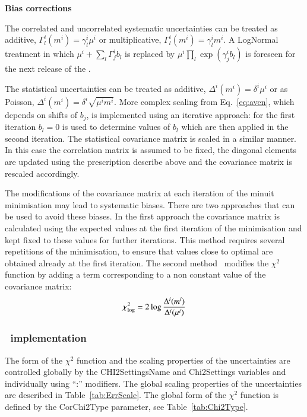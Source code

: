\begin{description}
\item \bf{Bias corrections}\rm

The correlated and uncorrelated systematic uncertainties can be treated as additive,  $\Gamma^i_l(m^i) = \gamma^i_l \mu^i$
or multiplicative, $\Gamma^i_l(m^i) = \gamma^i_l m^i$. A LogNormal treatment in which 
$ \mu^i + \sum_l \Gamma^i_j b_l$ is replaced by $ \mu^i \prod_l \exp( \gamma^i_j b_l) $ is foreseen for the
next release of the \fitter. 

The statistical uncertainties can be treated as additive, $\Delta^i(m^i) = \delta^i \mu^i$  or as Poisson,
$\Delta^i(m^i) = \delta^i \sqrt{\mu^i m^i}$. More complex scaling from Eq.~\ref{eq:aven}, 
which depends on shifts of $b_j$, is implemented using an iterative approach: for the first iteration $b_l =0$ 
 is used to determine values of $b_l$ which are then applied in the second iteration. The statistical covariance
matrix is scaled in a similar manner. In this case the correlation matrix is assumed to be fixed, the diagonal
elements are updated using the prescription describe above and the covariance matrix is rescaled accordingly.

The modifications of the covariance matrix at each iteration of the minuit minimisation may lead to systematic
biases. There are two approaches that can be used to avoid these biases. In the first approach the covariance matrix is calculated
using the expected values at the first iteration of the minimisation and kept fixed to these values for further
iterations. This method requires several repetitions of the minimisation, to ensure that values close to optimal
are obtained already at the first iteration. The second method~\cite{h1:2012kk} modifies the $\chi^2$ function by adding a term
corresponding to a non constant value of the covariance matrix:
\begin{equation}
 \chi^2_{\rm log} = 2 \log \frac{\Delta^i(m^i)}{\Delta^i(\mu^i)} 
\end{equation}  
\end{description}


\subsubsection{\fitter\ implementation}
The form of the $\chi^2$ function and the scaling properties of the 
uncertainties are controlled globally by the {\sc CHI2SettingsName} and
{\sc  Chi2Settings} variables and individually using {\sc ``:''} modifiers.
The global scaling properties of the uncertainties are described in 
Table~\ref{tab:ErrScale}. The global form of the $\chi^2$ function
is defined by the {\sc CorChi2Type} parameter, see   
Table~\ref{tab:Chi2Type}.

